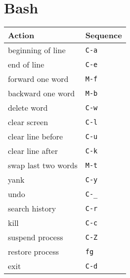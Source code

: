 \documentclass[report,twocolumn]{IEEEtran}
\begin{document}
\section{Bash}
\begin{center}
\begin{tabular}{ l | l }
\hline
Action & Sequence\\
\hline
beginning of line & \texttt{C-a} \\
end of line & \texttt{C-e} \\
forward one word & \texttt{M-f} \\
backward one word & \texttt{M-b} \\
\hline
delete word & \texttt{C-w} \\
clear screen & \texttt{C-l} \\
clear line before& \texttt{C-u} \\
clear line after & \texttt{C-k} \\
swap last two words & \texttt{M-t} \\
yank & \texttt{C-y} \\
undo & \texttt{C-\_} \\
\hline
search history & \texttt{C-r} \\
kill & \texttt{C-c} \\
suspend process & \texttt{C-Z} \\
restore process & \texttt{fg} \\
exit & \texttt{C-d} \\
\hline
\end{tabular}
\end{center}
\end{document}

